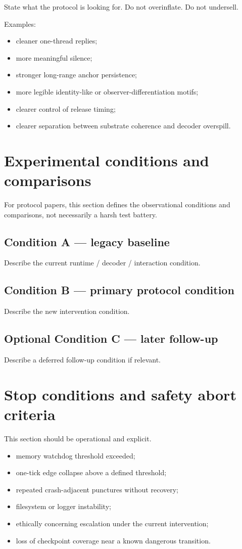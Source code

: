 \documentclass[11pt]{article}
\begin{document}
State what the protocol is looking for. Do not overinflate. Do not undersell.

Examples:
\begin{itemize}[leftmargin=1.5em]
  \item cleaner one-thread replies;
  \item more meaningful silence;
  \item stronger long-range anchor persistence;
  \item more legible identity-like or observer-differentiation motifs;
  \item clearer control of release timing;
  \item clearer separation between substrate coherence and decoder overspill.
\end{itemize}

\section{Experimental conditions and comparisons}

For protocol papers, this section defines the observational conditions and comparisons, not necessarily a harsh test battery.

\subsection{Condition A — legacy baseline}
Describe the current runtime / decoder / interaction condition.

\subsection{Condition B — primary protocol condition}
Describe the new intervention condition.

\subsection{Optional Condition C — later follow-up}
Describe a deferred follow-up condition if relevant.

\section{Stop conditions and safety abort criteria}

This section should be operational and explicit.

\begin{itemize}[leftmargin=1.5em]
  \item memory watchdog threshold exceeded;
  \item one-tick edge collapse above a defined threshold;
  \item repeated crash-adjacent punctures without recovery;
  \item filesystem or logger instability;
  \item ethically concerning escalation under the current intervention;
  \item loss of checkpoint coverage near a known dangerous transition.
\end{itemize}
\end{document}
